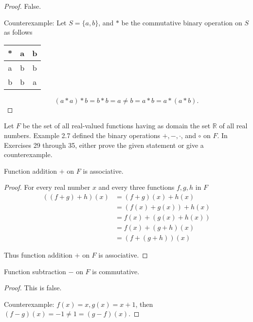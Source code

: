 \begin{proof}
    False.

    Counterexample: Let $S = \{ a, b \}$, and $*$ be the commutative binary operation on $S$ as follows
    \begin{tabular}{c|cc}
        * & a & b \\
        \midrule
        a & b & b \\
        b & b & a
    \end{tabular}

    \[
        (a * a) * b = b * b = a \ne b = a * b = a * (a * b).
    \]
\end{proof}

Let $F$ be the set of all real-valued functions having as domain the set $\mathbb{R}$ of all real numbers. Example 2.7 defined the binary operations $+, -, \cdot$, and $\circ$ on $F$. In Exercises 29 through 35, either prove the given statement or give a
counterexample.

\begin{exercise}
    Function addition $+$ on $F$ is associative.
\end{exercise}

\begin{proof}
    For every real number $x$ and every three functions $f, g, h$ in $F$
    \begin{align*}
        ((f + g) + h)(x) & = (f + g)(x) + h(x)    \\
                         & = (f(x) + g(x)) + h(x) \\
                         & = f(x) + (g(x) + h(x)) \\
                         & = f(x) + (g + h)(x)    \\
                         & = (f + (g + h))(x)
    \end{align*}

    Thus function addition $+$ on $F$ is associative.
\end{proof}

\begin{exercise}
    Function subtraction $-$ on $F$ is commutative.
\end{exercise}

\begin{proof}
    This is false.

    Counterexample: $f(x) = x, g(x) = x + 1$, then $(f - g)(x) = -1\ne 1 = (g - f)(x)$.
\end{proof}

